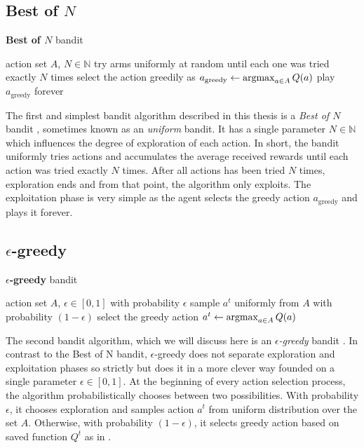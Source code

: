 \documentclass[../main.tex]{subfiles}
\begin{document}
\subsection{Best of $N$}\label{bandit:stochastic:bestofn}
\begin{algorithm}
    \caption{\textbf{Best of $N$} bandit}
    \label{bandit:stochastic:bestofn:alg}
    \begin{algorithmic}[1]
        \Require action set $A$, $N \in \mathbb{N}$
        \State try arms uniformly at random until each one was tried exactly $N$ times
        \State select the action greedily as $a_{\text{greedy}} \leftarrow \operatorname*{argmax}_{a \in A} Q(a)$
        \State play $a_{\text{greedy}}$ forever
    \end{algorithmic}
\end{algorithm}
The first and simplest bandit algorithm described in this thesis is a \textit{Best of $N$} bandit , sometimes known as an \textit{uniform} bandit.
It has a single parameter $N \in \mathbb{N}$ which influences the degree of exploration of each action.
In short, the bandit uniformly tries actions and accumulates the average received rewards until each action was tried exactly $N$ times.
After all actions has been tried $N$ times, exploration ends and from that point, the algorithm only exploits.
The exploitation phase is very simple as the agent selects the greedy action $a_{\text{greedy}}$  and plays it forever.

\subsection{$\epsilon$-greedy}\label{bandit:stochastic:epsgreedy}
\begin{algorithm}
    \caption{\textbf{$\epsilon$-greedy} bandit}
    \label{bandit:stochastic:epsgreedy:alg}
    \begin{algorithmic}[1]
        \Require action set $A$, $\epsilon \in \left[0, 1\right]$
        \State with probability $\epsilon$ sample $a^t$ uniformly from $A$
        \State with probability $\left(1 - \epsilon\right)$ select the greedy action $a^t \leftarrow \operatorname*{argmax}_{a \in A} Q(a)$
    \end{algorithmic}
\end{algorithm}
The second bandit algorithm, which we will discuss here is an \textit{$\epsilon$-greedy} bandit .
In contrast to the Best of N bandit, $\epsilon$-greedy does not separate exploration and exploitation phases so strictly but does it in a more clever way founded on a single parameter $\epsilon \in [0, 1]$.
At the beginning of every action selection process, the algorithm probabilistically chooses between two possibilities.
With probability $\epsilon$, it chooses exploration and samples action $a^t$ from uniform distribution over the set $A$.
Otherwise, with probability $\left(1 - \epsilon\right)$, it selects greedy action based on saved function $Q^t$ as in .
\end{document}
